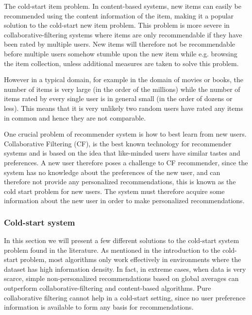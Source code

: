 The cold-start item problem. In content-based systems, new items can easily be recommended using the content information of the item, making it a popular solution \cite{} to the cold-start new item problem. This problem is more severe in collaborative-filtering systems where items are only recommendable if they have been rated by multiple users. New items will therefore not be recommendable before multiple users somehow stumble upon the new item while e.g. browsing the item collection, unless additional measures are taken to solve this problem.

However in a typical domain, for example in the domain of movies or books, the number of items is very large (in the order of the millions) while the number of items rated by every single user is in general small (in the order of dozens or less). This means that it is very unlikely two random users have rated any items in common and hence they are not comparable.

One crucial problem of recommender system is how to best learn from new users. Collaborative Filtering (CF), is the best known technology for recommender systems and is based on the idea that like-minded users have similar tastes and preferences. A new user therefore poses a challenge to CF recommender, since the system has no knowledge about the preferences of the new user, and can therefore not provide any personalized recommendations, this is known as the cold start problem for new users. The system must therefore acquire some information about the new user in order to make personalized recommendations.

\subsubsection{Cold-start system}

In this section we will present a few different solutions to the cold-start system problem found in the literature. As mentioned in the introduction to the cold-start problem, most algorithms only work effectively in environments where the dataset has high information density. In fact, in extreme cases, when data is very scarce, simple non-personalized recommendations based on global averages can outperform collaborative-filtering and content-based algorithms. Pure collaborative filtering cannot help in a cold-start setting, since no user preference information is available to form any basis for recommendations. 

